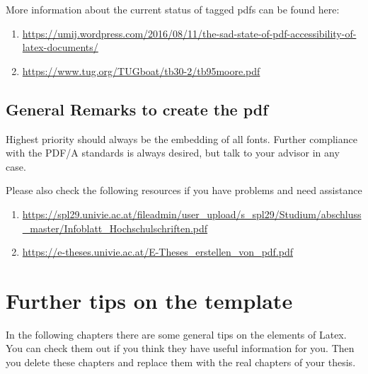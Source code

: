 	More information about the current status of tagged pdfs can be found here:
	\begin{enumerate}
		\item \url{https://umij.wordpress.com/2016/08/11/the-sad-state-of-pdf-accessibility-of-latex-documents/} 
		\item \url{https://www.tug.org/TUGboat/tb30-2/tb95moore.pdf}
	\end{enumerate}
	
	\subsection{General Remarks to create the pdf}
	Highest priority should always be the embedding of all fonts. Further compliance with the PDF/A standards is always desired, but talk to your advisor in any case.
	
	Please also check the following resources if you have problems and need assistance
	
	\begin{enumerate}
		\item \url{https://spl29.univie.ac.at/fileadmin/user_upload/s_spl29/Studium/abschluss_master/Infoblatt_Hochschulschriften.pdf} 
		\item \url{https://e-theses.univie.ac.at/E-Theses_erstellen_von_pdf.pdf}
	\end{enumerate}
	
	\section{Further tips on the template}
	In the following chapters there are some general tips on the elements of Latex. You can check them out if you think they have useful information for you. Then you delete these chapters and replace them with the real chapters of your thesis.
